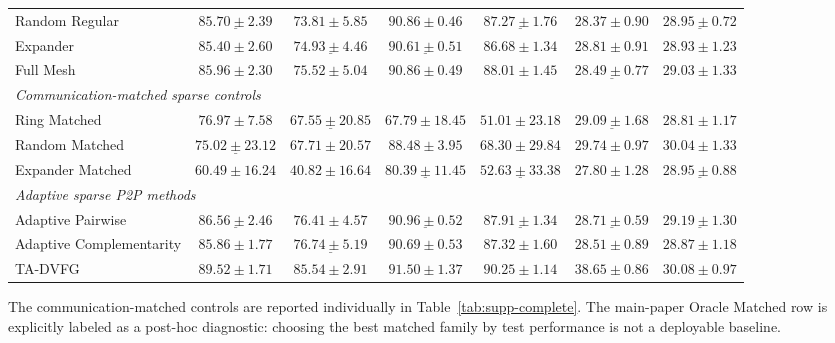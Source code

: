 \documentclass[letterpaper]{article}
\newcommand{\method}{\textsc{TA-DVFG}}
\begin{document}
\begin{table}[!t]
\begin{tabular}{lcccccc}
Random Regular
& $\underline{85.70\pm2.39}$
& $73.81\pm5.85$
& $\mathbf{90.86\pm0.46}$
& $\underline{87.27\pm1.76}$
& $28.37\pm0.90$
& $\underline{28.95\pm0.72}$ \\

Expander
& $85.40\pm2.60$
& $\underline{74.93\pm4.46}$
& $\underline{90.61\pm0.51}$
& $86.68\pm1.34$
& $\mathbf{28.81\pm0.91}$
& $28.93\pm1.23$ \\

Full Mesh
& $\mathbf{85.96\pm2.30}$
& $\mathbf{75.52\pm5.04}$
& $\mathbf{90.86\pm0.49}$
& $\mathbf{88.01\pm1.45}$
& $\underline{28.49\pm0.77}$
& $\mathbf{29.03\pm1.33}$ \\

\midrule
\multicolumn{7}{l}{\textit{Communication-matched sparse controls}} \\
Ring Matched
& $\mathbf{76.97\pm7.58}$
& $\underline{67.55\pm20.85}$
& $67.79\pm18.45$
& $51.01\pm23.18$
& $\underline{29.09\pm1.68}$
& $28.81\pm1.17$ \\

Random Matched
& $\underline{75.02\pm23.12}$
& $\mathbf{67.71\pm20.57}$
& $\mathbf{88.48\pm3.95}$
& $\mathbf{68.30\pm29.84}$
& $\mathbf{29.74\pm0.97}$
& $\mathbf{30.04\pm1.33}$ \\

Expander Matched
& $60.49\pm16.24$
& $40.82\pm16.64$
& $\underline{80.39\pm11.45}$
& $\underline{52.63\pm33.38}$
& $27.80\pm1.28$
& $\underline{28.95\pm0.88}$ \\

\midrule
\multicolumn{7}{l}{\textit{Adaptive sparse P2P methods}} \\
Adaptive Pairwise
& $\underline{86.56\pm2.46}$
& $76.41\pm4.57$
& $\underline{90.96\pm0.52}$
& $\underline{87.91\pm1.34}$
& $\underline{28.71\pm0.59}$
& $\underline{29.19\pm1.30}$ \\

Adaptive Complementarity
& $85.86\pm1.77$
& $\underline{76.74\pm5.19}$
& $90.69\pm0.53$
& $87.32\pm1.60$
& $28.51\pm0.89$
& $28.87\pm1.18$ \\

\method{}
& $\mathbf{89.52\pm1.71}$
& $\mathbf{85.54\pm2.91}$
& $\mathbf{91.50\pm1.37}$
& $\mathbf{90.25\pm1.14}$
& $\mathbf{38.65\pm0.86}$
& $\mathbf{30.08\pm0.97}$ \\

\bottomrule
\end{tabular}
\end{table}

The communication-matched controls are reported individually in
Table~\ref{tab:supp-complete}. The main-paper Oracle Matched row is explicitly
labeled as a post-hoc diagnostic: choosing the best matched family by test
performance is not a deployable baseline.
\end{document}
